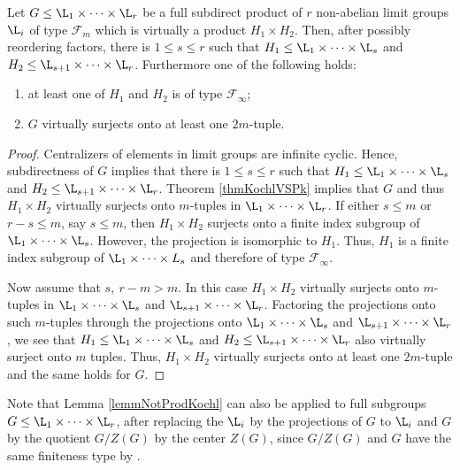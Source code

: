 \begin{lemma}
 Let $G\leq \L_1\times \dots \times \L_r$ be a full subdirect product of $r$ non-abelian limit groups $\L_i$ of type $\mathcal{F}_m$ which is virtually a product $H_1\times H_2$. Then, after possibly reordering factors, there is $1\leq s \leq r$ such that $H_1\leq \L_1 \times \dots \times \L_s$ and $H_2\leq \L_{s+1}\times \dots \times \L_r$. Furthermore one of the following holds:
 \begin{enumerate}
  \item at least one of $H_1$ and $H_2$ is of type $\mathcal{F}_{\infty}$;
  \item $G$ virtually surjects onto at least one $2m$-tuple.
 \end{enumerate}
 \label{lemmNotProdKochl}
\end{lemma}
\begin{proof}
 Centralizers of elements in limit groups are infinite cyclic. Hence, subdirectness of $G$ implies that there is $1\leq s \leq r$ such that $H_1\leq \L_1 \times \dots \times \L_s$ and $H_2\leq \L_{s+1}\times \dots \times \L_r$. Theorem \ref{thmKochlVSPk} implies that $G$ and thus $H_1\times H_2$ virtually surjects onto $m$-tuples in $\L_1 \times \dots \times \L_r$. If either $s\leq m$ or $r-s\leq m$, say $s\leq m$, then $H_1 \times H_2$ surjects onto a finite index subgroup of $\L_1 \times \dots \times \L_s$. However, the projection is isomorphic to $H_1$. Thus, $H_1$ is a finite index subgroup of $\L_1 \times \dots \times L_s$ and therefore of type $\mathcal{F}_{\infty}$.
 
 Now assume that $s, ~ r-m > m$. In this case $H_1 \times H_2 $ virtually surjects onto $m$-tuples in $\L_1 \times \dots \times \L_s$ and $\L_{s+1}\times \dots \times \L_{r}$. Factoring the projections onto such $m$-tuples through the projections onto $\L_1 \times \dots \times \L_s$ and $\L_{s+1}\times \dots \times \L_r$, we see that $H_1\leq \L_1 \times \dots \times \L_s$ and $H_2\leq \L_{s+1}\times \dots \times \L_r$ also virtually surject onto $m$ tuples. Thus, $H_1\times H_2$ virtually surjects onto at least one $2m$-tuple and the same holds for $G$. 
\end{proof}

\begin{remark}
Note that Lemma \ref{lemmNotProdKochl} can also be applied to full subgroups $G\leq \L_1\times \dots \times \L_r$, after replacing the $\L_i$ by the projections of $G$ to $\L_i$ and $G$ by the quotient $G/Z(G)$ by the center $Z(G)$, since $G/Z(G)$ and $G$ have the same finiteness type by \cite[Proposition 2.7]{Bie-81}.
\end{remark}



